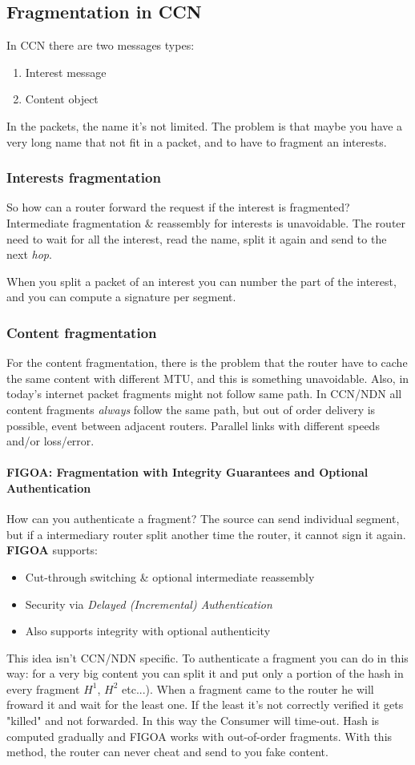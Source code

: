 \subsection{Fragmentation in CCN} In CCN there are two messages types:
\begin{enumerate}
  \item Interest message
  \item Content object
\end{enumerate}
In the packets, the name it's not limited. The problem is that maybe you have a
very long name that not fit in a packet, and to have to fragment an interests.

\subsubsection{Interests fragmentation} So how can a router forward the request
if the interest is fragmented?
Intermediate fragmentation \& reassembly for interests is unavoidable. The
router need to wait for all the interest, read the name, split it again and
send to the next \textit{hop}.

When you split a packet of an interest you can number the part of the interest,
and you can compute a signature per segment.

\subsubsection{Content fragmentation} For the content fragmentation, there is
the problem that the router have to cache the same content with different MTU,
and this is something unavoidable.
Also, in today's internet packet fragments might not follow same path. In
CCN/NDN all content fragments \textit{always} follow the same path, but out of
order delivery is possible, event between adjacent routers. Parallel links with
different speeds and/or loss/error.

\paragraph*{FIGOA: Fragmentation with Integrity Guarantees and Optional
Authentication} How can you authenticate a fragment? The source can send
individual segment, but if a intermediary router split another time the router,
it cannot sign it again.
\textbf{FIGOA} supports:
\begin{itemize}
  \item Cut-through switching \& optional intermediate reassembly
  \item Security via \textit{Delayed (Incremental) Authentication}
  \item Also supports integrity with optional authenticity
\end{itemize}
This idea isn't CCN/NDN specific.
To authenticate a fragment you can do in this way: for a very big content you
can split it and put only a portion of the hash in every fragment $H^1$, $H^2$
etc...). When a fragment came to the router he will froward it and wait for the
least one. If the least it's not correctly verified it gets "killed" and not
forwarded. In this way the Consumer will time-out.
Hash is computed gradually and FIGOA works with out-of-order fragments.
With this method, the router can never cheat and send to you fake content.
